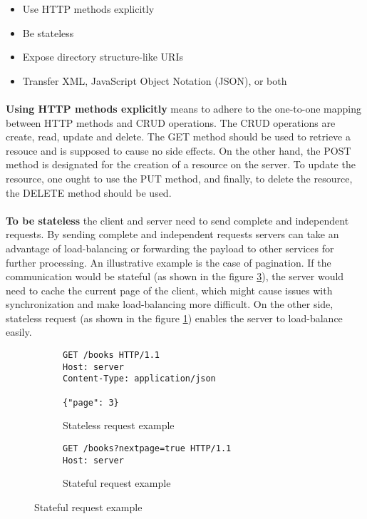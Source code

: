 \begin{itemize}
  \item Use HTTP methods explicitly
  \item Be stateless
  \item Expose directory structure-like URIs
  \item Transfer XML, JavaScript Object Notation (JSON), or both
\end{itemize}

\paragraph{}
\textbf{Using HTTP methods explicitly} means to adhere to the one-to-one mapping between HTTP methods and CRUD operations. The CRUD operations are create, read, update and delete. The GET method should be used to retrieve a resouce and is supposed to cause no side effects. On the other hand, the POST method is designated for the creation of a resource on the server. To update the resource, one ought to use the PUT method, and finally, to delete the resource, the DELETE method should be used.

\paragraph{}
\textbf{To be stateless} the client and server need to send complete and independent requests. By sending complete and independent requests servers can take an advantage of load-balancing or forwarding the payload to other services for further processing. An illustrative example is the case of pagination. If the communication would be stateful (as shown in the figure \ref{fig:Stateful request example}), the server would need to cache the current page of the client, which might cause issues with synchronization and make load-balancing more difficult. On the other side, stateless request (as shown in the figure \ref{fig:Stateless request example}) enables the server to load-balance easily.

\begin{figure}[h]
  \begin{subfigure}{}
    \begin{minipage}{0.5\textwidth}
      \begin{verbatim}
GET /books HTTP/1.1
Host: server
Content-Type: application/json

{"page": 3}
      \end{verbatim}
      \caption{Stateless request example}
      \label{fig:Stateless request example}
    \end{minipage}
  \end{subfigure}
  \begin{subfigure}{}
    \begin{minipage}{0.5\textwidth}
      \begin{verbatim}
GET /books?nextpage=true HTTP/1.1
Host: server
      \end{verbatim}
      \caption{Stateful request example}
      \label{fig:Stateful request example}
    \end{minipage}
  \end{subfigure}
\end{figure}

